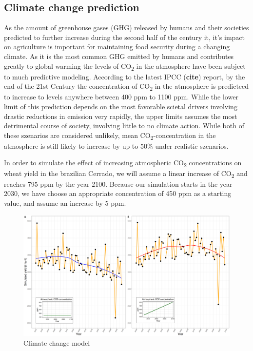 \documentclass[11pt]{article}
\begin{document}
\subsection{Climate change prediction}
\label{sec:orgf606077}
As the amount of greenhouse gases (GHG) released by humans and their societies predicted to further increase during the second half of the century it, it's impact on agriculture is important for maintaining food security during a changing climate. As it is the most common GHG emitted by humans and contributes greatly to global warming the levels of CO\textsubscript{2} in the atmosphere have been subject to much predictive modeling. According to the latest IPCC (\textbf{cite}) report, by the end of the 21st Century the concentration of CO\textsubscript{2} in the atmosphere is predicteed to increase to levels anywhere between 400 ppm to 1100 ppm. While the lower limit of this prediction depends on the most favorable scietal drivers involving drastic reductions in emission very rapidly, the upper limits assumes the most detrimental course of society, involving little to no climate action. While both of these szenarios are considered unlikely, mean CO\textsubscript{2}-concentration in the atmosphere is still likely to increase by up to 50\% under realistic szenarios.

In order to simulate the effect of increasing atmospheric CO\textsubscript{2} concentrations on wheat yield in the brazilian Cerrado, we will assume a linear increase of CO\textsubscript{2} and reaches 795 ppm by the year 2100. Because our simulation starts in the year 2030, we have choose an appropriate concentration of 450 ppm as a starting value, and assume an increase by 5 ppm.

\begin{figure}[htbp]
\centering
\includegraphics[width=1\textwidth]{../results/cc-model/2023-02-21_yield_prediction_cc_model_CO2_with_conc.png}
\caption{Climate change model}
\end{figure}
\end{document}
